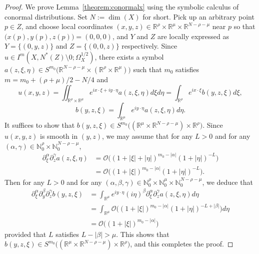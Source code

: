 \documentclass[a4paper,11pt,reqno]{amsart}
\numberwithin{equation}{section}
\theoremstyle{definition}
\theoremstyle{remark}
\begin{document}
%
%
\begin{proof}
We prove Lemma~\ref{theorem:conormalx} using the symbolic calculus of conormal distributions. 
Set $N:=\dim(X)$ for short. 
Pick up an arbitrary point $p \in Z$, and choose local coordinates 
$(x,y,z) \in \mathbb{R}^\rho\times\mathbb{R}^\mu\times\mathbb{R}^{N-\rho-\mu}$ near $p$ so that 
$\bigl(x(p),y(p),z(p)\bigr)=(0,0,0)$, and $Y$ and $Z$ are locally expressed as 
$Y=\{(0,y,z)\}$ and $Z=\{(0,0,z)\}$ respectively. 
Since $u \in I^m(X,N^\ast(Z)\setminus0;\Omega^{1/2}_X)$, there exists a symbol 
$a(z,\xi,\eta) \in S^{m_0}\bigl(\mathbb{R}^{N-\rho-\mu}\times(\mathbb{R}^\rho\times\mathbb{R}^\mu)\bigr)$ 
such that $m_0$ satisfies $m=m_0+(\rho+\mu)/2-N/4$ and 
%
%
$$
u(x,y,z)
=
\iint_{\mathbb{R}^\rho\times\mathbb{R}^\mu}
e^{ix\cdot\xi+iy\cdot\eta}
a(z,\xi,\eta)
d\xi
d\eta
=
\int_{\mathbb{R}^\rho}
e^{ix\cdot\xi}
b(y,z,\xi)
d\xi,
$$
%
%
$$
b(y,z,\xi)
=
\int_{\mathbb{R}^\mu}
e^{iy\cdot\eta}
a(z,\xi,\eta)
d\eta. 
$$
%
%
It suffices to show that 
$b(y,z,\xi) \in S^{m_0}\bigl((\mathbb{R}^\mu\times\mathbb{R}^{N-\rho-\mu})\times\mathbb{R}^\rho\bigr)$. 
Since $u(x,y,z)$ is smooth in $(y,z)$, 
we may assume that for any $L>0$ and for any 
$(\alpha,\gamma)\in\mathbb{N}_0^\rho\times\mathbb{N}_0^{N-\rho-\mu}$, 
%
%
\begin{align*}
  \partial_\xi^\alpha\partial_z^\gamma a(z,\xi,\eta)
& =
  \mathcal{O}
  \bigl(
  (1+\lvert\xi\rvert+\lvert\eta\rvert)^{m_0-\lvert\alpha\rvert}
  (1+\lvert\eta\rvert)^{-L}
  \bigr)
\\
& =
  \mathcal{O}
  \bigl(
  (1+\lvert\xi\rvert)^{m_0-\lvert\alpha\rvert}
  (1+\lvert\eta\rvert)^{-L}
  \bigr). 
\end{align*}
%
%
Then for any $L>0$ and for any 
$(\alpha,\beta,\gamma)\in\mathbb{N}_0^\rho\times\mathbb{N}_0^\mu\times\mathbb{N}_0^{N-\rho-\mu}$, 
we deduce that 
%
%
\begin{align*}
  \partial_\xi^\alpha\partial_y^\beta\partial_z^\gamma b(y,z,\xi)
& =
  \int_{\mathbb{R}^\mu}
  e^{iy\cdot\eta}
  (i\eta)^\beta
  \partial_\xi^\alpha \partial_z^\gamma a(z,\xi,\eta)
  d\eta
\\
& =
  \int_{\mathbb{R}^\mu}
  \mathcal{O}
  \bigl(
  (1+\lvert\xi\rvert)^{m_0-\lvert\alpha\rvert}
  (1+\lvert\eta\rvert)^{-L+\lvert\beta\rvert}
  \bigr)
  d\eta
\\
& =
  \mathcal{O}
  \bigl(
  (1+\lvert\xi\rvert)^{m_0-\lvert\alpha\rvert}
  \bigr)
\end{align*}
%
%
provided that $L$ satisfies $L-\lvert\beta\rvert>\mu$. 
This shows that 
$b(y,z,\xi) \in S^{m_0}\bigl((\mathbb{R}^\mu\times\mathbb{R}^{N-\rho-\mu})\times\mathbb{R}^\rho\bigr)$, 
and this completes the proof.    
\end{proof}
\end{document}
